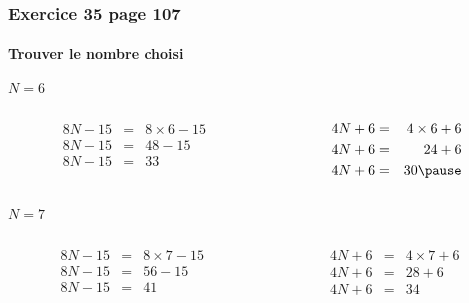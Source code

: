 \documentclass[xcolor={dvipsnames}]{beamer}
\begin{document}
\begin{frame}
	\frametitle{Exercice 35 page 107}
	\framesubtitle{Trouver le nombre choisi}
	
	\begin{block}{$N = 6$}
		
		\begin{columns}
			\begin{column}{0.5\textwidth}
				\begin{eqnarray*}
					8N - 15 &=&  8 \times 6 - 15 \\ 
					8N - 15 &=& 48 - 15 \\ 
					8N - 15 &=& 33 
				\end{eqnarray*}
			\end{column}
			
			
			\begin{column}{0.5\textwidth}
				\begin{eqnarray*}
					4N + 6 &=&  4 \times 6 + 6 \\ 
					4N + 6 &=& 24 + 6 \\ 
					4N + 6 &=& 30 \pause
				\end{eqnarray*}
			\end{column}
		\end{columns}
		
	\end{block}


	\begin{block}{$N = 7$}
		
		\begin{columns}
			\begin{column}{0.5\textwidth}
				\begin{eqnarray*}
					8N - 15 &=&  8 \times 7 - 15 \\ 
					8N - 15 &=& 56 - 15 \\ 
					8N - 15 &=& 41 
				\end{eqnarray*}
			\end{column}
			
			
			\begin{column}{0.5\textwidth}
				\begin{eqnarray*}
					4N + 6 &=&  4 \times 7 + 6 \\ 
					4N + 6 &=& 28 + 6 \\ 
					4N + 6 &=& 34 
				\end{eqnarray*}
			\end{column}
		\end{columns}
		
	\end{block}


\end{frame}
\end{document}
